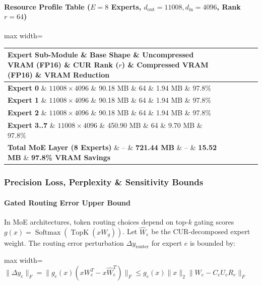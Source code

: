 \paragraph{Resource Profile Table ($E = 8$ Experts, $d_{\text{out}} = 11008, d_{\text{in}} = 4096$, Rank $r = 64$)}

\begin{center}
\begin{adjustbox}{max width=\columnwidth}
\renewcommand{\arraystretch}{1.2}
\begin{tabular}{llllll}
\toprule
Expert Sub-Module \& Base Shape \& Uncompressed VRAM (FP16) \& CUR Rank ($r$) \& Compressed VRAM (FP16) \& VRAM Reduction \\
\midrule
\textbf{Expert 0} \& $11008 \times 4096$ \& 90.18 MB \& 64 \& 1.94 MB \& 97.8\% \\
\textbf{Expert 1} \& $11008 \times 4096$ \& 90.18 MB \& 64 \& 1.94 MB \& 97.8\% \\
\textbf{Expert 2} \& $11008 \times 4096$ \& 90.18 MB \& 64 \& 1.94 MB \& 97.8\% \\
\textbf{Expert 3..7} \& $11008 \times 4096$ \& 450.90 MB \& 64 \& 9.70 MB \& 97.8\% \\
\textbf{Total MoE Layer (8 Experts)} \& -- \& \textbf{721.44 MB} \& -- \& \textbf{15.52 MB} \& \textbf{97.8\% VRAM Savings} \\

\bottomrule
\end{tabular}
\end{adjustbox}
\end{center}

\subsubsection*{Precision Loss, Perplexity \& Sensitivity Bounds}

\paragraph{Gated Routing Error Upper Bound}
In MoE architectures, token routing choices depend on top-$k$ gating scores $g(x) = \operatorname{Softmax}(\operatorname{TopK}(x W_g))$. Let $\hat{W}_e$ be the CUR-decomposed expert weight. The routing error perturbation $\Delta y_{\text{router}}$ for expert $e$ is bounded by:

\begin{center}
\begin{adjustbox}{max width=\columnwidth}
$\displaystyle
\|\Delta y_e\|_F = \|g_e(x) (x W_e^T - x \hat{W}_e^T)\|_F \le g_e(x) \|x\|_2 \|W_e - C_e U_e R_e\|_F
$
\end{adjustbox}
\end{center}

